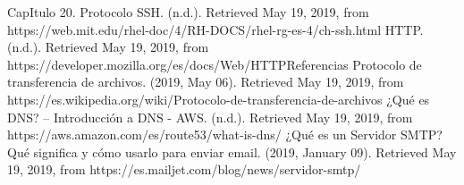 {}
\begin{thebibliography}{99}
 CapItulo 20. Protocolo SSH. (n.d.). Retrieved May 19, 2019, from https://web.mit.edu/rhel-doc/4/RH-DOCS/rhel-rg-es-4/ch-ssh.html
 HTTP. (n.d.). Retrieved May 19, 2019, from https://developer.mozilla.org/es/docs/Web/HTTPReferencias
 Protocolo de transferencia de archivos. (2019, May 06). Retrieved May 19, 2019, from https://es.wikipedia.org/wiki/Protocolo-de-transferencia-de-archivos
 ¿Qué es DNS? – Introducción a DNS - AWS. (n.d.). Retrieved May 19, 2019, from https://aws.amazon.com/es/route53/what-is-dns/
 ¿Qué es un Servidor SMTP? Qué significa y cómo usarlo para enviar email. (2019, January 09). Retrieved May 19, 2019, from https://es.mailjet.com/blog/news/servidor-smtp/
\end{thebibliography}